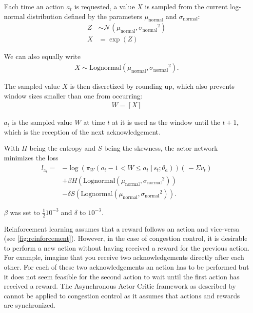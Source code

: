 \documentclass[sigconf]{acmart}
\newcommand\givenbase[1][]{\:#1\lvert\:}
\let\given\givenbase
\begin{document}
Each time an action $a_t$ is requested, a value $X$ is sampled from the current log-normal distribution defined by the parameters $\mu_\text{normal}$ and $\sigma_\text{normal}$: 
\begin{align*}
Z&\sim {\mathcal {N}}(\mu_\text{normal} ,{\sigma_{\text{normal}}}^{2})\\
X&=\exp(Z)
\end{align*}

We can also equally write
\begin{align*}
X \sim \text{Lognormal}\left( \mu_\text{normal}, {\sigma_{\text{normal}}}^{2}\right).
\end{align*}

The sampled value $X$ is then discretized by rounding up, which also prevents window sizes smaller than one from occurring:
\begin{align*}
W = \left\lceil X \right\rceil
\end{align*}

$a_t$ is the sampled value $W$ at time $t$ at it is used as the window until the $t+1$, which is the reception of the next acknowledgement. 


With $H$ being the entropy and $S$ being the skewness, the actor network minimizes the loss
\begin{align*}
l_{\text{a}_t} =& -\log \left( \pi_W\left( a_t-1 < W \leq a_t \given s_t; \theta_a \right)\right)\left(\frac{}{} - \Sigma v_t\right)\\ 
&+ \beta H\left(\text{Lognormal}\left( \mu_\text{normal}, {\sigma_{\text{normal}}}^{2}\right) \right)\\
&- \delta S\left(\text{Lognormal}\left( \mu_\text{normal}, {\sigma_{\text{normal}}}^{2}\right) \right).
\end{align*}

$\beta$ was set to $\frac 1 2 10^{-3}$ and $\delta$ to $10^{-3}$.

Reinforcement learning assumes that a reward follows an action and vice-versa (see \autoref{fig:reinforcement}). However, in the case of congestion control, it is desirable to perform a new action without having received a reward for the previous action. For example, imagine that you receive two acknowledgements directly after each other. For each of these two acknowledgements an action has to be performed but it does not seem feasible for the second action to wait until the first action has received a reward. The Asynchronous Actor Critic framework as described by \cite{mnih_asynchronous_2016} cannot be applied to congestion control as it assumes that actions and rewards are synchronized.
\end{document}
